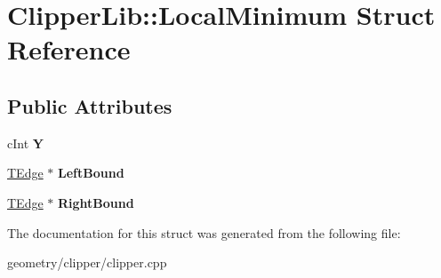 \hypertarget{struct_clipper_lib_1_1_local_minimum}{}\section{Clipper\+Lib\+:\+:Local\+Minimum Struct Reference}
\label{struct_clipper_lib_1_1_local_minimum}
\subsection*{Public Attributes}
\begin{DoxyCompactItemize}
\item 
\mbox{\label{struct_clipper_lib_1_1_local_minimum_a71836a7c572ddfcf8853accb7314b7cf}} 
c\+Int {\bfseries Y}
\item 
\mbox{\label{struct_clipper_lib_1_1_local_minimum_a0e7b997adca472b6e80f3223c45965ea}} 
\mbox{\hyperlink{struct_clipper_lib_1_1_t_edge}{T\+Edge}} $\ast$ {\bfseries Left\+Bound}
\item 
\mbox{\label{struct_clipper_lib_1_1_local_minimum_ade212cfb8c35da168b2bf20ad3e0ac94}} 
\mbox{\hyperlink{struct_clipper_lib_1_1_t_edge}{T\+Edge}} $\ast$ {\bfseries Right\+Bound}
\end{DoxyCompactItemize}


The documentation for this struct was generated from the following file\+:\begin{DoxyCompactItemize}
\item 
geometry/clipper/clipper.\+cpp\end{DoxyCompactItemize}
